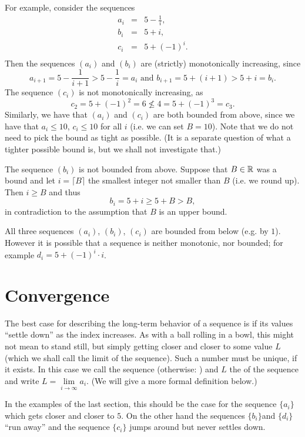 For example, consider the sequences
\begin{eqnarray*}
a_i&=&5-\frac{1}{i},\\
b_i&=&5+i,\\
c_i&=&5+(-1)^i.\\
\end{eqnarray*}
Then the sequences $(a_i)$ and $(b_i)$ are (strictly) monotonically increasing, since
\[
a_{i+1}=5-\frac{1}{i+1}> 5-\frac{1}{i}=a_i
\mbox{\ and \ }
b_{i+1}=5+(i+1)> 5+i=b_i.
\]
The sequence $(c_i)$ is not monotonically increasing, as 
\[
c_2=5+(-1)^2=6\not\le 4=5+(-1)^3=c_3.
\]Similarly, we have that $(a_i)$ and $(c_i)$ are both bounded from above, since we have
that $a_i\le 10$, $c_i\le 10$ for all $i$ (i.e. we can set $B=10$).
Note that we do not need to pick the bound as tight as possible. (It is a separate
question of what a tighter possible bound is, but we shall not investigate that.)

The sequence $(b_i)$ is not bounded from above. Suppose that $B\in{\mathbb R}$ was a bound and
let $i=\lceil B\rceil$ the smallest integer not smaller than $B$ (i.e. we round up).
Then $i\ge B$ and thus
\[
b_i=5+i\ge5+B>B,
\]
in contradiction to the assumption that $B$ is an upper bound.

All three sequences $(a_i)$, $(b_i)$, $(c_i)$ are bounded from below (e.g. by $1$).
However it is possible that a sequence is neither monotonic, nor bounded; for example 
$d_i=5+(-1)^i\cdot i$.

\section{Convergence}
\label{seclimits}

The best case for describing the long-term behavior of a sequence is if
its values ``settle down'' as the index increases. As with a ball rolling in a bowl, this
might not mean to stand still, but simply getting
closer and closer to some value $L$ (which we shall call the limit of the sequence).
Such a number must be unique, if it exists.
In this case we call the sequence  (otherwise:
)
and $L$ the  of the
sequence and write $L=\lim\limits_{i\to\infty}a_i$. (We will give a more formal
definition below.)

In the examples of the last section, this should be the case for the sequence
$\{a_i\}$ which gets closer and closer to $5$. On the other hand the
sequences $\{b_i\} $and $\{d_i\} $ ``run away'' and the sequence $\{c_i\}$
jumps around but never settles down.


